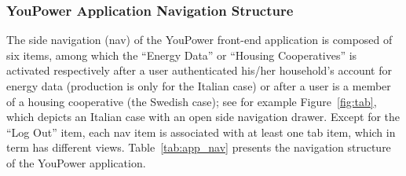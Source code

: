 %
%
%
%
%

\subsubsection{YouPower Application Navigation Structure}

The side navigation (nav) of the YouPower front-end application is composed of six items, among which the ``Energy Data'' or ``Housing Cooperatives'' is activated respectively after a user authenticated his/her household's account for energy data (production is only for the Italian case) or after a user is a member of a housing cooperative (the Swedish case); see for example Figure~\ref{fig:tab}, which depicts an Italian case with an open side navigation drawer. 
Except for the ``Log Out'' item, each nav item is associated with at least one tab item, which in term has different views. Table~\ref{tab:app_nav} presents the navigation structure of the YouPower application. 

